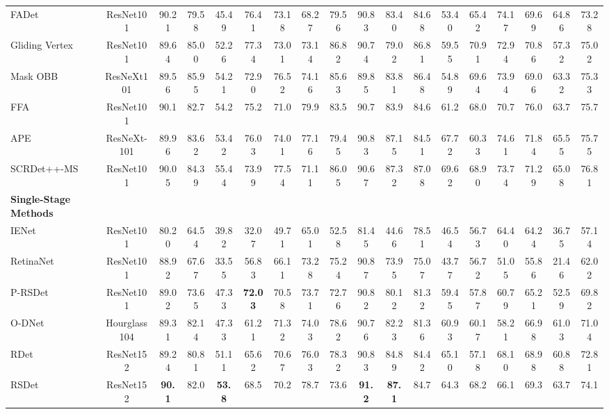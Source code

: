 \documentclass[10pt,twocolumn]{article}
\begin{document}
\begin{table*}[!tb]
{\begin{tabular}{l|c|c|c|c|c|c|c|c|c|c|c|c|c|c|c|c|c}
			FADet \cite{li2019feature} & ResNet101 & 90.21 & 79.58 & 45.49 & 76.41 & 73.18 & 68.27 & 79.56 & 90.83 & 83.40 & 84.68 & 53.40 & 65.42 & 74.17 & 69.69 & 64.86 & 73.28\\
			Gliding Vertex \cite{xu2020gliding} & ResNet101 & 89.64 & 85.00 & 52.26 & 77.34 & 73.01 & 73.14 & 86.82 & 90.74 & 79.02 & 86.81 & 59.55 & 70.91 & 72.94 & 70.86 & 57.32 & 75.02 \\
			Mask OBB \cite{wang2019mask} & ResNeXt101 & 89.56 & 85.95 & 54.21 & 72.90 & 76.52 & 74.16 & 85.63 & 89.85 & 83.81 & 86.48 & 54.89 & 69.64 & 73.94 & 69.06 & 63.32 & 75.33 \\
			FFA \cite{fu2020rotation} & ResNet101 & 90.1 & 82.7 & 54.2 & 75.2 & 71.0 & 79.9 & 83.5 & 90.7 & 83.9 & 84.6 & 61.2 & 68.0 & 70.7 & 76.0 & 63.7 & 75.7 \\
			APE \cite{zhu2020adaptive} & ResNeXt-101 & 89.96 & 83.62 & 53.42 & 76.03 & 74.01 & 77.16 & 79.45 & 90.83 & 87.15 & 84.51 & 67.72 & 60.33 & 74.61 & 71.84 & 65.55 & 75.75 \\
			SCRDet++-MS \cite{yang2020scrdet++} & ResNet101 & 90.05 & 84.39 & 55.44 & 73.99 & 77.54 & 71.11 & 86.05 & 90.67 & 87.32 & 87.08 & 69.62 & 68.90 & 73.74 & 71.29 & 65.08 & 76.81 \\
			\hline
			\textbf{Single-Stage Methods} & \multicolumn{16}{|c}{} \\
			\hline
			IENet \cite{lin2019ienet} & ResNet101 & 80.20 & 64.54 & 39.82 & 32.07 & 49.71 & 65.01 & 52.58 & 81.45 & 44.66 & 78.51 & 46.54 & 56.73 & 64.40 & 64.24 & 36.75 & 57.14 \\
			RetinaNet \cite{lin2017focal} & ResNet101 & 88.92 & 67.67 & 33.55 & 56.83 & 66.11 & 73.28 & 75.24 & 90.87 & 73.95 & 75.07 & 43.77 & 56.72 & 51.05 & 55.86 & 21.46 & 62.02 \\
			P-RSDet \cite{zhou2020objects} & ResNet101 & 89.02 & 73.65 & 47.33 & \textbf{72.03} & 70.58 & 73.71 & 72.76 & 90.82 & 80.12 & 81.32 & 59.45 & 57.87 & 60.79 & 65.21 & 52.59 & 69.82 \\
			O-DNet \cite{wei2019oriented} & Hourglass104 \cite{newell2016stacked} & 89.31 & 82.14 & 47.33 & 61.21 & 71.32 & 74.03 & 78.62 & 90.76 & 82.23 & 81.36 & 60.93 & 60.17 & 58.21 & 66.98 & 61.03 & 71.04 \\
			RDet \cite{yang2019r3det} & ResNet152 & 89.24 & 80.81 & 51.11 & 65.62 & 70.67 & 76.03 & 78.32 & 90.83 & 84.89 & 84.42 & 65.10 & 57.18 & 68.10 & 68.98 & 60.88 & 72.81\\
			RSDet \cite{qian2019learning} & ResNet152 & \textbf{90.1} & 82.0 & \textbf{53.8} & 68.5 & 70.2 & 78.7 & 73.6 & \textbf{91.2} & \textbf{87.1} & 84.7 & 64.3 & 68.2 & 66.1 & 69.3 & 63.7 & 74.1 \\ 

\end{tabular}}
\end{table*}
\end{document}
